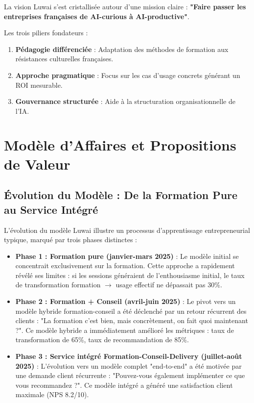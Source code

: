 La vision Luwai s'est cristallisée autour d'une mission claire : \textbf{"Faire passer les entreprises françaises de AI-curious à AI-productive"}.

Les trois piliers fondateurs :
\begin{enumerate}
    \item \textbf{Pédagogie différenciée} : Adaptation des méthodes de formation aux résistances culturelles françaises.
    \item \textbf{Approche pragmatique} : Focus sur les cas d'usage concrets générant un ROI mesurable.
    \item \textbf{Gouvernance structurée} : Aide à la structuration organisationnelle de l'IA.
\end{enumerate}

\section{Modèle d'Affaires et Propositions de Valeur}

\subsection{Évolution du Modèle : De la Formation Pure au Service Intégré}

L'évolution du modèle Luwai illustre un processus d'apprentissage entrepreneurial typique, marqué par trois phases distinctes :

\begin{itemize}
    \item \textbf{Phase 1 : Formation pure (janvier-mars 2025)} : Le modèle initial se concentrait exclusivement sur la formation. Cette approche a rapidement révélé ses limites : si les sessions généraient de l'enthousiasme initial, le taux de transformation formation $\rightarrow$ usage effectif ne dépassait pas 30\%.
    \item \textbf{Phase 2 : Formation + Conseil (avril-juin 2025)} : Le pivot vers un modèle hybride formation-conseil a été déclenché par un retour récurrent des clients : "La formation c'est bien, mais concrètement, on fait quoi maintenant ?". Ce modèle hybride a immédiatement amélioré les métriques : taux de transformation de 65\%, taux de recommandation de 85\%.
    \item \textbf{Phase 3 : Service intégré Formation-Conseil-Delivery (juillet-août 2025)} : L'évolution vers un modèle complet "end-to-end" a été motivée par une demande client récurrente : "Pouvez-vous également implémenter ce que vous recommandez ?". Ce modèle intégré a généré une satisfaction client maximale (NPS 8.2/10).
\end{itemize}

